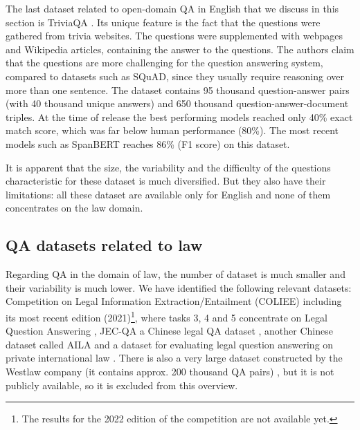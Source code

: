\documentclass{IOS-Book-Article}
\begin{document}
The last dataset related to open-domain QA in English that we discuss in this section is TriviaQA
\cite{joshi2017triviaqa}. Its unique feature is the fact that the questions were gathered from trivia websites. The questions were supplemented with webpages and Wikipedia articles, containing the answer to the questions. The authors claim that the questions are more challenging for the question answering system, compared to datasets such as SQuAD, since they usually require reasoning over more than one sentence. The dataset contains 95 thousand question-answer pairs (with 40 thousand unique answers) and 650 thousand question-answer-document triples. At the time of release the best performing
models reached only 40\% exact match score, which was far below human performance (80\%). The most recent models such as SpanBERT \cite{joshi2020spanbert} reaches 86\% (F1 score) on this dataset.

It is apparent that the size, the variability and the difficulty of the questions characteristic for these dataset is much diversified. But they also have their limitations: all these dataset are available only for English and none of them concentrates on the law domain.

\subsection{QA datasets related to law}

Regarding QA in the domain of law, the number of dataset is much smaller and their variability is much lower. We have identified the following relevant datasets: Competition on Legal Information Extraction/Entailment (COLIEE) including its most recent edition (2021)\footnote{The results for the 2022 edition of the competition are not available yet.}, where tasks 3, 4 and 5 concentrate on Legal Question Answering \cite{rabelo2021summary}, JEC-QA a Chinese legal QA dataset \cite{zhong2019jecqa}, another Chinese dataset called AILA \cite{weiyi2020aila} and a dataset for evaluating legal question answering on private international law \cite{sovrano2021dataset}. There is also a very large dataset constructed by the Westlaw company (it contains approx.  200 thousand QA pairs) \cite{mcelvain2019westsearch}, but it is not publicly available, so it is excluded from this overview.
\end{document}
